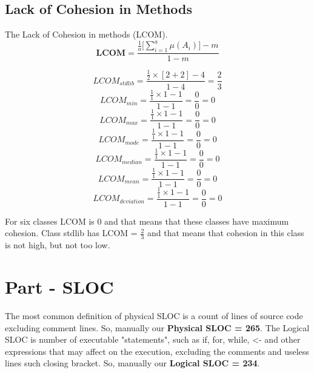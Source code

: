\documentclass[12pt]{article}
\begin{document}
\subsection{Lack of Cohesion in Methods}
The Lack of Cohesion in methods (LCOM).
\begin{equation}
    \textbf{LCOM} =\frac{\frac{1}{a}\Big[\sum^{a}_{i=1}{\mu(A_{i})\big]-m}}{1-m}
\end{equation}

\begin{equation}
    LCOM_{stdlib} =\frac{\frac{1}{2}\times[2+2]-4}{1-4} = \frac{2}{3}
\end{equation}
\begin{equation}
    LCOM_{min} = \frac{\frac{1}{1}\times1-1}{1-1} = \frac{0}{0} = 0
\end{equation}
\begin{equation}
    LCOM_{max} = \frac{\frac{1}{1}\times1-1}{1-1} = \frac{0}{0} = 0
\end{equation}
\begin{equation}
    LCOM_{mode} = \frac{\frac{1}{1}\times1-1}{1-1} = \frac{0}{0} = 0
\end{equation}
\begin{equation}
    LCOM_{median} = \frac{\frac{1}{1}\times1-1}{1-1} = \frac{0}{0} = 0
\end{equation}
\begin{equation}
    LCOM_{mean} = \frac{\frac{1}{1}\times1-1}{1-1} = \frac{0}{0} = 0
\end{equation}
\begin{equation}
    LCOM_{deviation} = \frac{\frac{1}{1}\times1-1}{1-1} = \frac{0}{0} = 0
\end{equation}

For six classes LCOM is 0 and that means that these classes have maximum cohesion. Class stdlib has LCOM = $\frac{2}{3}$ and that means that cohesion in this class is not high, but not too low.
\section{Part - SLOC}
The most common definition of physical SLOC is a count of lines of source code excluding comment lines.
So, manually our \textbf{Physical SLOC = 265}. The Logical SLOC is number of executable "statements", such as if, for, while, <- and other expressions that may affect on the execution, excluding the comments and useless lines such closing bracket. So, manually our \textbf{Logical SLOC = 234}.\\
\end{document}
